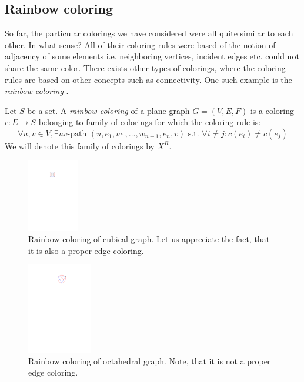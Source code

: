 \subsection{Rainbow coloring}

So far, the particular colorings we have considered were all quite similar to each other. In what sense? All of their coloring rules were based of the notion of adjacency of some elements i.e. neighboring vertices, incident edges etc. could not share the same color. There exists other types of colorings, where the coloring rules are based on other concepts such as connectivity. One such example is the \textit{rainbow coloring} \cite{chartrand08}.

\begin{defn}
    Let $S$ be a set. A \emph{rainbow coloring} of a plane graph $G=(V,E,F)$ is a coloring $c: E \rightarrow S$ belonging to family of colorings for which the coloring rule is: 
    \begin{equation}\label{eqn:rainbow_rule}
     \forall u,v \in V, \exists uv \text{-path } (u,e_1,w_1, \ldots ,w_{n-1},e_n,v) \text{ s.t. } \forall i \neq j : c(e_i) \neq c(e_j) \tag{$R_R$}
    \end{equation}
    We will denote this family of colorings by $X^R$.
\end{defn}

\begin{figure}[H]
    \centering
    \includegraphics[width=0.2\textwidth]{../Resources/Figs/cubical_edg_colr.pdf}
    \caption{Rainbow coloring of cubical graph. Let us appreciate the fact, that it is also a proper edge coloring.}
    \label{fig:cubical_rainbow_coloring}
\end{figure}

\begin{figure}[H]
    \centering
    \includegraphics[width=0.25\textwidth]{../Resources/Figs/octahedral_rainbow_colr.pdf}
    \caption{Rainbow coloring of octahedral graph. Note, that it is not a proper edge coloring.}
    \label{fig:octahedral_rainbow_coloring}
\end{figure}

